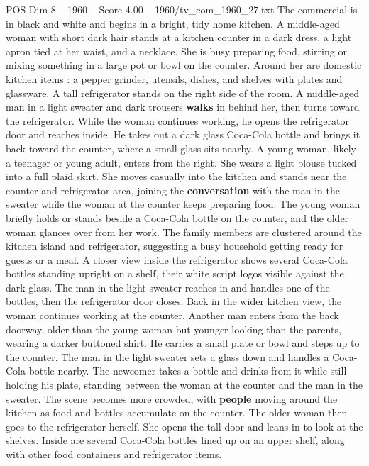 \begin{textsample}{POS Dim 8 – 1960 – Score 4.00 – 1960/tv\_com\_1960\_27.txt}  \label{ex:f8_pos_089}
The commercial is in black and white and begins in a bright, tidy home kitchen.
A middle-aged woman with short dark hair stands at a kitchen counter in a dark dress, a light apron tied at her waist, and a necklace.
She is busy preparing food, stirring or mixing something in a large pot or bowl on the counter.
Around her are domestic kitchen items : a pepper grinder, utensils, dishes, and shelves with plates and glassware.
A tall refrigerator stands on the right side of the room.
A middle-aged man in a light sweater and dark trousers \textbf{walks} in behind her, then turns toward the refrigerator.
While the woman continues working, he opens the refrigerator door and reaches inside.
He takes out a dark glass Coca-Cola bottle and brings it back toward the counter, where a small glass sits nearby.
A young woman, likely a teenager or young adult, enters from the right.
She wears a light blouse tucked into a full plaid skirt.
She moves casually into the kitchen and stands near the counter and refrigerator area, joining the \textbf{conversation} with the man in the sweater while the woman at the counter keeps preparing food.
The young woman briefly holds or stands beside a Coca-Cola bottle on the counter, and the older woman glances over from her work.
The family members are clustered around the kitchen island and refrigerator, suggesting a busy household getting ready for guests or a meal.
A closer view inside the refrigerator shows several Coca-Cola bottles standing upright on a shelf, their white script logos visible against the dark glass.
The man in the light sweater reaches in and handles one of the bottles, then the refrigerator door closes.
Back in the wider kitchen view, the woman continues working at the counter.
Another man enters from the back doorway, older than the young woman but younger-looking than the parents, wearing a darker buttoned shirt.
He carries a small plate or bowl and steps up to the counter.
The man in the light sweater sets a glass down and handles a Coca-Cola bottle nearby.
The newcomer takes a bottle and drinks from it while still holding his plate, standing between the woman at the counter and the man in the sweater.
The scene becomes more crowded, with \textbf{people} moving around the kitchen as food and bottles accumulate on the counter.
The older woman then goes to the refrigerator herself.
She opens the tall door and leans in to look at the shelves.
Inside are several Coca-Cola bottles lined up on an upper shelf, along with other food containers and refrigerator items.

\end{textsample}
